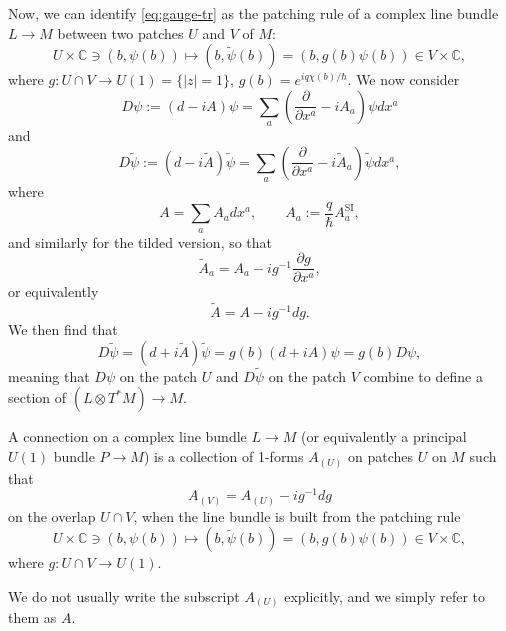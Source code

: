 \documentclass[12pt]{article}
\numberwithin{equation}{section}
\numberwithin{figure}{section}
\theoremstyle{remark}
\def\bC{\mathbb{C}}
\begin{document}
Now, we can identify \eqref{eq:gauge-tr} as the patching rule of a complex line bundle $L\to M$  between two patches $U$ and $V$ of $M$:
\begin{equation}
  U\times \bC \ni (b,\psi(b)) \mapsto (b,\tilde\psi(b))=(b,g(b)\psi(b)) \in V\times \bC,
\end{equation} where $g:U\cap V\to U(1)=\{|z|=1\}$, $g(b)=e^{iq\chi(b)/\hbar}$.
We now consider \begin{equation}
D\psi :=(d - i A )\psi = \sum_a \left(\frac{\partial}{\partial x^a} - i A_a\right)\psi dx^a
\end{equation} and \begin{equation}
D\tilde\psi:=(d - i\tilde A) \tilde\psi = \sum_a \left(\frac{\partial}{\partial x^a} - i \tilde A_a\right)\tilde\psi dx^a,
\end{equation} where \begin{equation}
A= \sum_a A_a dx^a, \qquad A_a := \frac{q}{\hbar} A^\text{SI}_a,
\end{equation} and similarly for the tilded version, so that \begin{equation}
\tilde A_a = A_a - i g^{-1} \frac{\partial g}{\partial x^a},
\end{equation} or equivalently \begin{equation}
\tilde A = A - i g^{-1} dg.
\end{equation}
We then find that \begin{equation}
D\tilde \psi = (d + i\tilde A) \tilde\psi = g(b) (d + i A) \psi = g(b) D\psi,
\end{equation}
meaning that $D\psi$ on the patch $U$ and $D\tilde \psi$ on the patch $V$
 combine to define a section of $(L\otimes T^*M) \to M$.

\begin{definition}
A connection on a complex line bundle $L\to M$ 
(or equivalently a principal $U(1)$ bundle $P\to M$)
is a collection of 1-forms $A_{(U)}$ on patches $U$ on $M$ such that \begin{equation}
  A_{(V)}=A_{(U)} - i g^{-1} dg
\end{equation}
on the overlap $U\cap V$, when the line bundle is built from the patching rule \begin{equation}
  U\times \bC \ni (b,\psi(b)) \mapsto (b,\tilde\psi(b))=(b,g(b)\psi(b)) \in V\times \bC,
\end{equation}
where $g:U\cap V\to U(1)$.
\end{definition}

We do not usually write the subscript $A_{(U)}$ explicitly,
and we simply refer to them as $A$.
\end{document}
